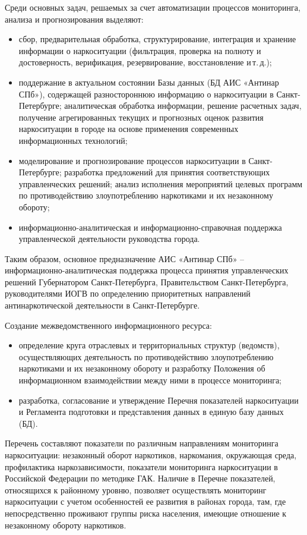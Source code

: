 Среди основных задач, решаемых за счет автоматизации процессов мониторинга,
анализа и прогнозирования выделяют:
\begin{itemize}
\item сбор, предварительная обработка, структурирование, интеграция и хранение
информации о наркоситуации (фильтрация, проверка на полноту и достоверность,
верификация, резервирование, восстановление и\,т.\,д.);
\item поддержание в актуальном состоянии Базы данных (БД АИС «Антинар СПб»),
содержащей разностороннюю информацию о наркоситуации в Санкт-Петербурге;
аналитическая обработка информации, решение расчетных задач, получение
агрегированных текущих и прогнозных оценок развития наркоситуации в городе на
основе применения современных информационных технологий;
\item моделирование и прогнозирование процессов наркоситуации в Санкт-Петербурге;
разработка предложений для принятия соответствующих управленческих решений;
анализ исполнения мероприятий целевых программ по противодействию
злоупотреблению наркотиками и их незаконному обороту;
\item информационно-аналитическая и информационно-справочная поддержка
управленческой деятельности руководства города.
\end{itemize}
Таким образом, основное предназначение АИС «Антинар СПб» –
информационно-аналитическая поддержка процесса принятия управленческих решений
Губернатором Санкт-Петербурга, Правительством Санкт-Петербурга, руководителями
ИОГВ по определению приоритетных направлений антинаркотической деятельности в
Санкт-Петербурге. 

Создание межведомственного информационного ресурса:
\begin{itemize}
\item определение круга отраслевых и территориальных структур (ведомств),
осуществляющих деятельность по противодействию злоупотреблению наркотиками и их
незаконному обороту и  разработку Положения об информационном взаимодействии
между ними в процессе мониторинга;
\item разработка, согласование и утверждение Перечня показателей наркоситуации и
Регламента подготовки и представления данных в единую базу данных (БД). 
\end{itemize}
Перечень составляют показатели по различным направлениям мониторинга
наркоситуации: незаконный оборот наркотиков, наркомания, окружающая среда,
профилактика наркозависимости, показатели мониторинга наркоситуации в Российской
Федерации по методике ГАК. Наличие в Перечне показателей, относящихся к
районному уровню, позволяет осуществлять мониторинг наркоситуации с учетом
особенностей ее развития в районах города, там, где непосредственно проживают
группы риска населения, имеющие отношение к незаконному обороту наркотиков. 


